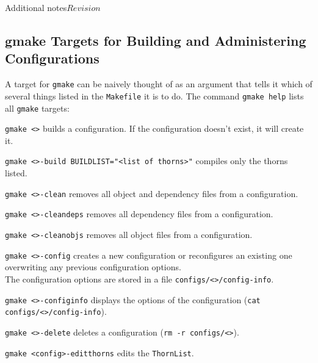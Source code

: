 \begin{cactuspart}{Additional notes}{}{$Revision$}
\subsection{gmake Targets for Building and Administering Configurations}
\label{sec:gmtafobuanadco}

A target for \texttt{gmake} can be naively thought of as an argument
that tells it which of several things listed in the \texttt{Makefile} it
is to do. The command \texttt{gmake help} lists all \texttt{gmake} targets:

\begin{Lentry}

\item [\texttt{gmake <\var{config}>}]
        builds a configuration. If the configuration doesn't exist,
        it will create it.

\item [\texttt{gmake <\var{config}>-build BUILDLIST="<list of thorns>"}]
compiles only the thorns listed.

\item [\texttt{gmake <\var{config}>-clean}] removes all object and dependency
files from a configuration.

\item [\texttt{gmake <\var{config}>-cleandeps}] removes all dependency files
from a configuration.

\item [\texttt{gmake <\var{config}>-cleanobjs}] removes all object files from
  a configuration.

\item [\texttt{gmake <\var{config}>-config}] creates a new configuration or
reconfigures an existing one overwriting any previous configuration options.\\
The configuration options are stored in a file
\texttt{configs/<>/config-info}.

\item [\texttt{gmake <\var{config}>-configinfo}] displays the options
of the configuration (\texttt{cat configs/<>/config-info}).

\item [\texttt{gmake <\var{config}>-delete}] deletes a configuration
(\texttt{rm -r configs/<>}).

\item [\texttt{gmake <config>-editthorns}] edits the \texttt{ThornList}.


\end{Lentry}
\end{cactuspart}
